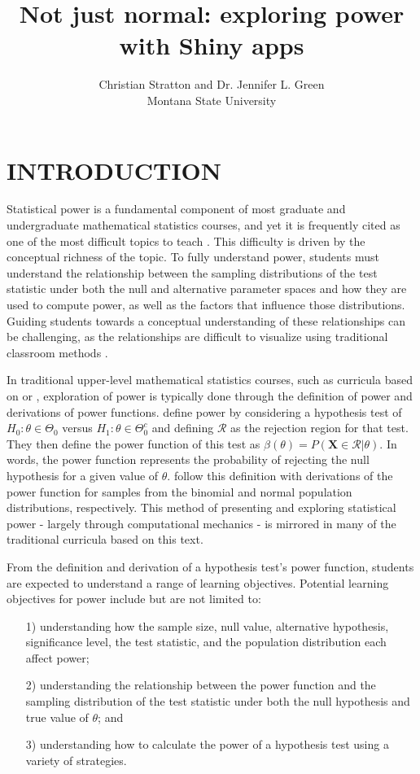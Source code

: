 \documentclass{TISE}
\title{Not just normal: exploring power with Shiny apps}
\author{Christian Stratton and Dr. Jennifer L. Green \\ Montana State University}
\begin{document}
	
\section{INTRODUCTION}

Statistical power is a fundamental component of most graduate and undergraduate mathematical statistics courses, and yet it is frequently cited as one of the most difficult topics to teach \citep{aberson2002}. This difficulty is driven by the conceptual richness of the topic. To fully understand power, students must understand the relationship between the sampling distributions of the test statistic under both the null and alternative parameter spaces and how they are used to compute power, as well as the factors that influence those distributions. Guiding students towards a conceptual understanding of these relationships can be challenging, as the relationships are difficult to visualize using traditional classroom methods \citep{aberson2002}.

In traditional upper-level mathematical statistics courses, such as curricula based on \cite{wackerly2008} or \cite{casella2002}, exploration of power is typically done through the definition of power and derivations of power functions. \cite{casella2002} define power by considering a hypothesis test of $H_0 : \theta \in \Theta_0$ versus $H_1 : \theta \in \Theta_0^c$ and defining $\mathcal{R}$ as the rejection region for that test. They then define the power function of this test as $\beta(\theta) = P(\boldsymbol{X} \in \mathcal{R} | \theta)$. In words, the power function represents the probability of rejecting the null hypothesis for a given value of $\theta$. \cite{casella2002} follow this definition with derivations of the power function for samples from the binomial and normal population distributions, respectively. This method of presenting and exploring statistical power - largely through computational mechanics - is mirrored in many of the traditional curricula based on this text. 

From the definition and derivation of a hypothesis test's power function, students are expected to understand a range of learning objectives. Potential learning objectives for power include but are not limited to:
\begin{itemize}
	\item[1)] understanding how the sample size, null value, alternative hypothesis, significance level, the test statistic, and the population distribution each affect power;
	\item[2)] understanding the relationship between the power function and the sampling distribution of the test statistic under both the null hypothesis and true value of $\theta$; and
	\item[3)] understanding how to calculate the power of a hypothesis test using a variety of strategies.
\end{itemize}
\end{document}

